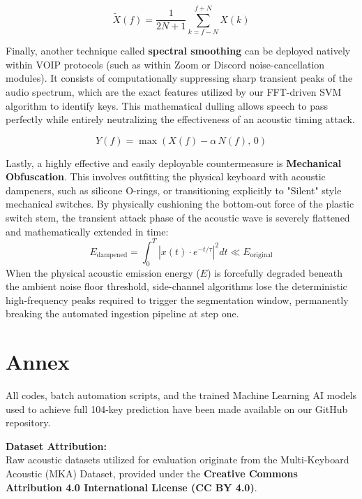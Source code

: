 \documentclass[12pt,a4paper]{article}
\begin{document}
\begin{equation}
\tilde{X}(f) = \frac{1}{2N+1} \sum_{k=f-N}^{f+N} X(k)
\end{equation}

Finally, another technique called \textbf{spectral smoothing} can be deployed natively within VOIP protocols (such as within Zoom or Discord noise-cancellation modules). It consists of computationally suppressing sharp transient peaks of the audio spectrum, which are the exact features utilized by our FFT-driven SVM algorithm to identify keys. This mathematical dulling allows speech to pass perfectly while entirely neutralizing the effectiveness of an acoustic timing attack.

\begin{equation}
Y(f) = \max\left( X(f) - \alpha \, N(f), \, 0 \right)
\end{equation}

Lastly, a highly effective and easily deployable countermeasure is \textbf{Mechanical Obfuscation}. This involves outfitting the physical keyboard with acoustic dampeners, such as silicone O-rings, or transitioning explicitly to "Silent" style mechanical switches. By physically cushioning the bottom-out force of the plastic switch stem, the transient attack phase of the acoustic wave is severely flattened and mathematically extended in time:
\begin{equation}
E_{\text{dampened}} = \int_{0}^{T} |x(t) \cdot e^{-t/\tau}|^2 dt \ll E_{\text{original}}
\end{equation}
When the physical acoustic emission energy ($E$) is forcefully degraded beneath the ambient noise floor threshold, side-channel algorithms lose the deterministic high-frequency peaks required to trigger the segmentation window, permanently breaking the automated ingestion pipeline at step one.

\newpage
\chapter*{\Huge\textbf{Annex}}

All codes, batch automation scripts, and the trained Machine Learning AI models used to achieve full 104-key prediction have been made available on our GitHub repository. 

\vspace{0.5cm}
\noindent
\textbf{Dataset Attribution:}\\
Raw acoustic datasets utilized for evaluation originate from the Multi-Keyboard Acoustic (MKA) Dataset, provided under the \textbf{Creative Commons Attribution 4.0 International License (CC BY 4.0)}. 
\end{document}
